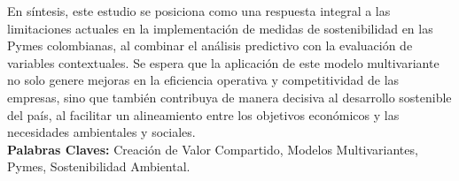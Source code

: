 En síntesis, este estudio se posiciona como una respuesta integral a las limitaciones actuales en la implementación de medidas de sostenibilidad en las Pymes colombianas, al combinar el análisis predictivo con la evaluación de variables contextuales. Se espera que la aplicación de este modelo multivariante no solo genere mejoras en la eficiencia operativa y competitividad de las empresas, sino que también contribuya de manera decisiva al desarrollo sostenible del país, al facilitar un alineamiento entre los objetivos económicos y las necesidades ambientales y sociales.\\

\textbf{Palabras Claves:} Creación de Valor Compartido, Modelos Multivariantes, Pymes, Sostenibilidad Ambiental.

